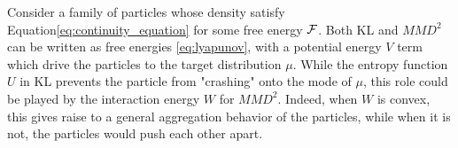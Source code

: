 \begin{remark}
	Consider a family of particles whose density satisfy Equation\cref{eq:continuity_equation} for some free energy ${{\mathcal F}}$. Both KL and $MMD^2$ can be written as free energies \eqref{eq:lyapunov}, with a potential energy $V$ term which drive the particles to the target distribution $\mu$. While the entropy function $U$ in KL prevents the particle from "crashing" onto the mode of $\mu$, this role could be played by the interaction energy $W$ for $MMD^2$. Indeed, when $W$ is convex, this gives raise to a general aggregation behavior of the particles, while when it is not, the particles would push each other apart.
\end{remark}

 









